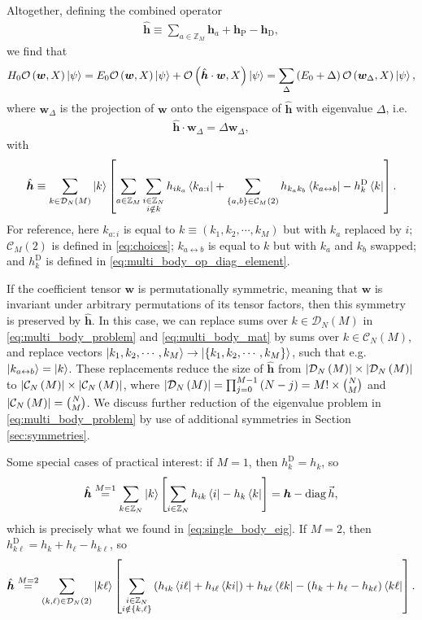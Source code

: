 \documentclass[nofootinbib,notitlepage,11pt]{revtex4-2}
\renewcommand{\t}{\text} %
\newcommand{\p}[1]{\left(#1\right)} %
\renewcommand{\sp}[1]{\left[#1\right]} %
\renewcommand{\set}[1]{\left\{#1\right\}} %
\renewcommand{\c}{\cdot} %
\newcommand{\m}{\bm} %
\renewcommand{\v}{\vec} %
\newcommand{\1}{\mathds{1}}
\renewcommand{\i}{\mathrm{i}\mkern1mu}
\newcommand{\C}{\mathcal{C}}
\newcommand{\D}{\mathcal{D}}
\renewcommand{\O}{\mathcal{O}}
\newcommand{\ZZ}{\mathbb{Z}}
\newcommand{\oper}{\operatorname}
\newcommand{\lra}{\leftrightarrow}
\begin{document}
Altogether, defining the combined operator
\begin{align}
  \hat{\m h}
  \equiv \sum_{a\in\ZZ_M} \m h_a + \m h_{\t{P}} - \m h_{\t{D}},
\end{align}
we find that
\begin{align}
  H_0 \O\p{\m w,X} \ket\psi
  = E_0 \O\p{\m w,X} \ket\psi +
  \O\p{\hat{\m h}\c\m w, X} \ket\psi
  = \sum_\Delta \p{E_0+\Delta} \O\p{\m w_\Delta, X} \ket\psi,
\end{align}
where $\m w_\Delta$ is the projection of $\m w$ onto the eigenspace of $\hat{\m h}$ with eigenvalue $\Delta$, i.e.
\begin{align}
  \hat{\m h} \c \m w_\Delta = \Delta \m w_\Delta,
  \label{eq:multi_body_problem}
\end{align}
with
\begin{align}
  \hat{\m h} \equiv \sum_{k\in\D_N\p{M}} \ket{k}
  \sp{\sum_{a\in\ZZ_M} \sum_{\substack{i\in\ZZ_N\\i\notin k}}
    h_{ik_a} \bra{k_{a:i}}
    + \sum_{\set{a,b}\in\C_M\p{2}} h_{k_ak_b} \bra{k_{a\lra b}}
    - h^{\t{D}}_k \bra{k}}.
  \label{eq:multi_body_mat}
\end{align}
For reference, here $k_{a:i}$ is equal to $k\equiv\p{k_1,k_2,\cdots,k_M}$ but with $k_a$ replaced by $i$; $\C_M\p{2}$ is defined in \eqref{eq:choices}; $k_{a\lra b}$ is equal to $k$ but with $k_a$ and $k_b$ swapped; and $h^{\t{D}}_k$ is defined in \eqref{eq:multi_body_op_diag_element}.

If the coefficient tensor $\m w$ is permutationally symmetric, meaning that $\m w$ is invariant under arbitrary permutations of its tensor factors, then this symmetry is preserved by $\hat{\m h}$.
In this case, we can replace sums over $k\in\D_N\p{M}$ in \eqref{eq:multi_body_problem} and \eqref{eq:multi_body_mat} by sums over $k\in\C_N\p{M}$, and replace vectors $\ket{k_1,k_2,\cdots,k_M}\to\ket{\set{k_1,k_2,\cdots,k_M}}$, such that e.g.~$\ket{k_{a\lra b}}=\ket{k}$.
These replacements reduce the size of $\hat{\m h}$ from $\abs{\D_N\p{M}}\times\abs{\D_N\p{M}}$ to $\abs{\C_N\p{M}}\times\abs{\C_N\p{M}}$, where $\abs{\D_N\p{M}}=\prod_{j=0}^{M-1}\p{N-j}=M!\times{N\choose M}$ and $\abs{\C_N\p{M}}={N\choose M}$.
We discuss further reduction of the eigenvalue problem in \eqref{eq:multi_body_problem} by use of additional symmetries in Section \ref{sec:symmetries}.

Some special cases of practical interest: if $M=1$, then $h^{\t{D}}_k=h_k$, so
\begin{align}
  \hat{\m h} \stackrel{M=1}{=} \sum_{k\in\ZZ_N} \ket{k}
  \sp{\sum_{i\in\ZZ_N} h_{ik} \bra{i} - h_k \bra{k}}
  = \m h - \oper{diag}\v h,
\end{align}
which is precisely what we found in \eqref{eq:single_body_eig}.
If $M=2$, then $h_{k\ell}^{\t{D}}=h_k+h_\ell-h_{k\ell}$, so
\begin{align}
  \hat{\m h} \stackrel{M=2}{=}
  \sum_{\p{k,\ell}\in\D_N\p{2}} \ket{k\ell}
  \sp{\sum_{\substack{i\in\ZZ_N\\i\notin\set{k,\ell}}}
    \p{ h_{ik} \bra{i\ell} + h_{i\ell} \bra{ki} }
    + h_{k\ell} \bra{\ell k}
    - \p{h_k + h_\ell - h_{k\ell}} \bra{k\ell}}.
\end{align}
\end{document}
